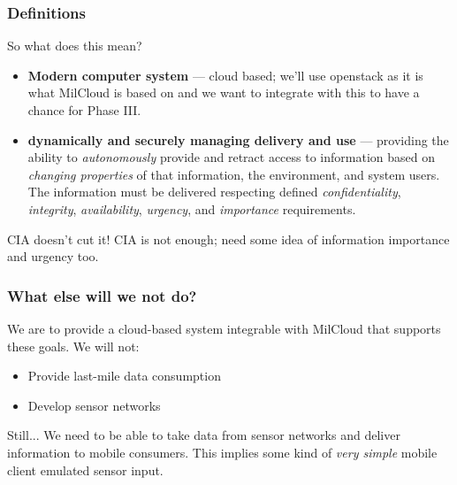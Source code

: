 \documentclass[t,handout]{beamer}
\begin{document}
\begin{frame}
\frametitle{Definitions}
So what does this mean? \\
\begin{itemize}
\item {\small {\bf Modern computer system} --- cloud based; we'll use openstack as it is what MilCloud is based on and we want to integrate with this to have a chance for Phase III.}
\item {\small {\bf dynamically and securely managing delivery and use} --- providing the ability to {\sl autonomously} provide and retract access to information based on {\sl changing properties} of that information, the environment, and system users.  The information must be delivered respecting defined {\sl confidentiality}, {\sl integrity}, {\sl availability}, {\sl urgency}, and {\sl importance} requirements.}
\end{itemize}
\begin{beamerboxesrounded}[shadow]{CIA doesn't cut it!}
{\small CIA is not enough; need some idea of information importance and urgency too.}
\end{beamerboxesrounded}
\end{frame}

\begin{frame}
\frametitle{What else will we not do?}
We are to provide a cloud-based system integrable with MilCloud that supports these goals.  We will not:
\begin{itemize}
\item Provide last-mile data consumption
\item Develop sensor networks
\end{itemize}
\begin{beamerboxesrounded}[shadow]{Still...}
{\small We need to be able to take data from sensor networks and deliver information to mobile consumers. This implies some kind of {\sl very simple} mobile client emulated sensor input.}
\end{beamerboxesrounded}
\end{frame}
\end{document}
